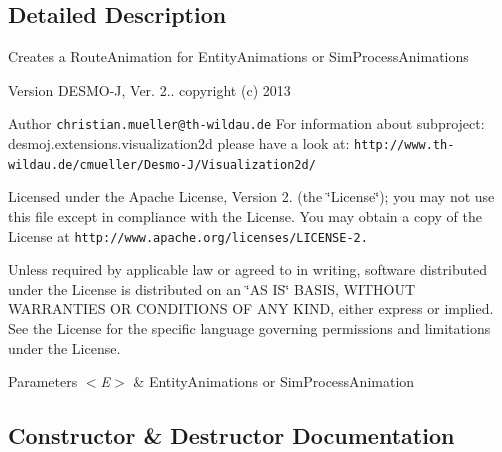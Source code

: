 \subsection{Detailed Description}
Creates a Route\-Animation for Entity\-Animations or Sim\-Process\-Animations

\begin{DoxyVersion}{Version}
D\-E\-S\-M\-O-\/\-J, Ver. 2.. copyright (c) 2013 
\end{DoxyVersion}
\begin{DoxyAuthor}{Author}
{\tt christian.\-mueller@th-\/wildau.\-de} For information about subproject\-: desmoj.\-extensions.\-visualization2d please have a look at\-: {\tt http\-://www.\-th-\/wildau.\-de/cmueller/\-Desmo-\/\-J/\-Visualization2d/}
\end{DoxyAuthor}
Licensed under the Apache License, Version 2. (the \char`\"{}\-License\char`\"{}); you may not use this file except in compliance with the License. You may obtain a copy of the License at {\tt http\-://www.\-apache.\-org/licenses/\-L\-I\-C\-E\-N\-S\-E-\/2.}

Unless required by applicable law or agreed to in writing, software distributed under the License is distributed on an \char`\"{}\-A\-S I\-S\char`\"{} B\-A\-S\-I\-S, W\-I\-T\-H\-O\-U\-T W\-A\-R\-R\-A\-N\-T\-I\-E\-S O\-R C\-O\-N\-D\-I\-T\-I\-O\-N\-S O\-F A\-N\-Y K\-I\-N\-D, either express or implied. See the License for the specific language governing permissions and limitations under the License.


\begin{DoxyParams}{Parameters}
{\em $<$\-E$>$} & Entity\-Animations or Sim\-Process\-Animation \\
\hline
\end{DoxyParams}


\subsection{Constructor \& Destructor Documentation}
